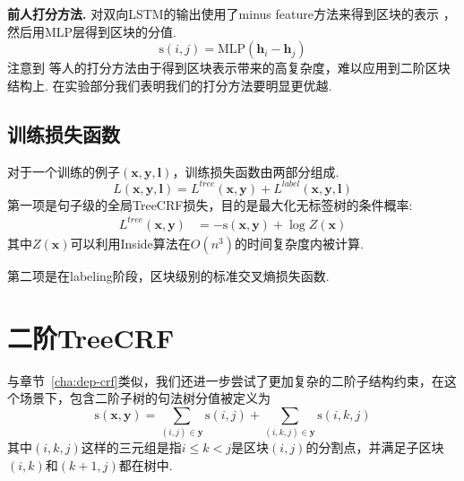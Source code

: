 \noindent\textbf{前人打分方法.}
\citet{stern-etal-2017-minimal}对双向LSTM的输出使用了minus feature方法来得到区块的表示 \citep{wang-chang-2016-graph,cross-huang-2016-span}，然后用MLP层得到区块的分值.
\begin{equation} \label{eq:minus-score}
  \mathrm{s}(i,j)=\mathrm{MLP}(\mathbf{h}_{i}-\mathbf{h}_{j})
\end{equation}
注意到 \citet{stern-etal-2017-minimal}等人的打分方法由于得到区块表示带来的高复杂度，难以应用到二阶区块结构上.
在实验部分我们表明我们的打分方法要明显更优越.

\subsection{训练损失函数}

对于一个训练的例子$(\boldsymbol{x},\boldsymbol{y},\boldsymbol{l})$，训练损失函数由两部分组成.
\begin{equation} \label{eq:final-loss}
  \mathit{L}(\boldsymbol{x}, \boldsymbol{y}, \boldsymbol{l}) = \mathit{L}^{tree}(\boldsymbol{x}, \boldsymbol{y}) + \mathit{L}^{label}(\boldsymbol{x}, \boldsymbol{y}, \boldsymbol{l})
\end{equation}
第一项是句子级的全局TreeCRF损失，目的是最大化无标签树的条件概率:
\begin{equation}\label{eq:bracket-loss}
  \begin{split}
    \mathit{L}^{tree}(\boldsymbol{x},\boldsymbol{y})
    &= -\mathrm{s}(\boldsymbol{x}, \boldsymbol{y}) + \log Z(\boldsymbol{x})
  \end{split}
\end{equation}
其中$Z(\boldsymbol{x})$可以利用Inside算法在$O(n^3)$的时间复杂度内被计算.

第二项是在labeling阶段，区块级别的标准交叉熵损失函数.

\section{二阶TreeCRF}
\label{sec:con-2o-treecrf}

与章节~\ref{cha:dep-crf}类似，我们还进一步尝试了更加复杂的二阶子结构约束，在这个场景下，包含二阶子树的句法树分值被定义为
\begin{equation} \label{eq:2ostree-score}
  \mathrm{s}(\boldsymbol{x},\boldsymbol{y}) = \sum\limits_{(i,j)\in \boldsymbol{y}}\mathrm{s}(i,j)+\sum\limits_{(i,k,j)\in \boldsymbol{y}}\mathrm{s}(i,k,j)
\end{equation}
其中$(i,k,j)$这样的三元组是指$i \leq k < j$是区块$(i,j)$的分割点，并满足子区块$(i,k)$和$(k+1,j)$都在树中.

